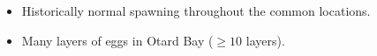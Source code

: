 \begin{itemize}
\item Historically normal spawning throughout the common locations.
\item Many layers of eggs in Otard Bay ($\geq 10$ layers).
\end{itemize}